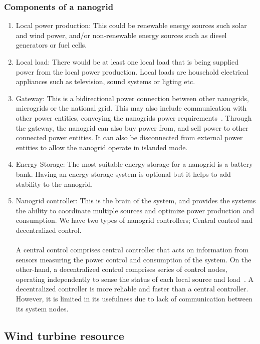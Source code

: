 \documentclass[titlepage]{article}
\begin{document}
\subsubsection{Components of a nanogrid}
\begin{enumerate}
    \item Local power production: This could be renewable energy sources such solar and wind power, and/or non-renewable energy sources such as diesel generators or fuel cells.
    \item Local load: There would be at least one local load that is being supplied power from the local power production. Local loads are household electrical appliances such as television, sound systems or ligting etc.
    \item Gateway: This is a bidirectional power connection between other nanogrids, microgrids or the national grid. This may also include communication with other power entities, conveying the nanogrids power requirements~\cite{Burmester}. Through the gateway, the nanogrid can also buy power from, and sell power to other connected power entities. It can also be disconnected from external power entities to allow the nanogrid operate in islanded mode. 
    \item Energy Storage: The most suitable energy storage for a nanogrid is a battery bank. Having an energy storage system is optional but it helps to add stability to the nanogrid.
    \item Nanogrid controller: This is the brain of the system, and provides the systems the ability to coordinate multiple sources and optimize power production and consumption. We have two types of nanogrid controllers; Central control and decentralized control. 
    \paragraph{}A central control comprises central controller that acts on information from sensors measuring the power control and consumption of the system. On the other-hand, a decentralized control comprises series of control nodes, operating independently to sense the status of each local source and load~\cite{Burmester}. A decentralized controller is more reliable and faster than a central controller. However, it is limited in its usefulness due to lack of communication between its system nodes.   
\end{enumerate}

\subsection{Wind turbine resource}
\end{document}
